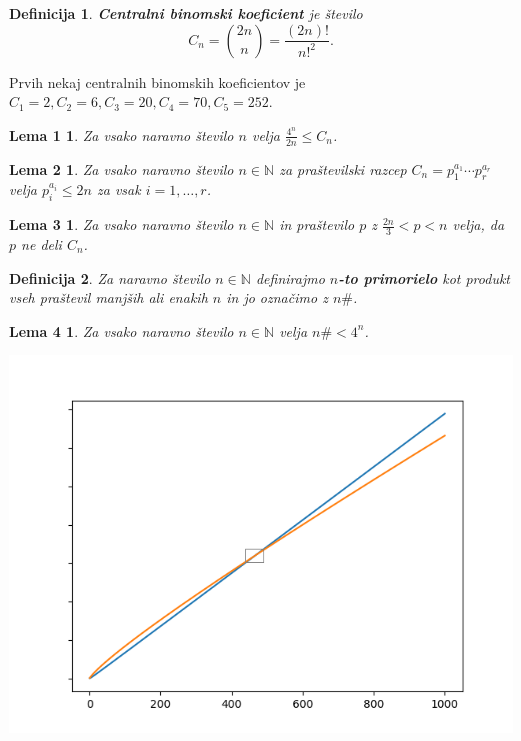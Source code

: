 \documentclass{beamer}
\newtheorem{definicija}{Definicija}
\newtheorem{lema1}{Lema 1}
\newtheorem{lema2}{Lema 2}
\newtheorem{lema3}{Lema 3}
\newtheorem{lema4}{Lema 4}
\def\N{\mathbb{N}}
\begin{document}
\begin{frame}
    \begin{definicija} %
        \textbf{Centralni binomski koeficient} je število $$C_n = \binom{2n}{n} = \frac{(2n)!}{n!^2}.$$
    \end{definicija}
    \pause
    \medskip
    Prvih nekaj centralnih binomskih koeficientov je $C_1 = 2, C_2 = 6, C_3 = 20, C_4 = 70, C_5 = 252$.
    \pause
    \medskip
    \begin{lema1}
        \label{lema1}
        Za vsako naravno število $n$ velja $\frac{4^n}{2n} \leq C_n$.
    \end{lema1}
    \pause
    \medskip
    \begin{lema2}
        \label{lema2}
        Za vsako naravno število $n \in \N$ za praštevilski razcep $C_n = p_1^{a_1} \cdots p_r^{a_r}$ velja $p_i^{a_i} \leq 2n$ za vsak $i = 1,\ldots,r$. 
    \end{lema2}
\end{frame}


\begin{frame}
    \begin{lema3}
        \label{lema3}
        Za vsako naravno število $n \in \N$ in praštevilo $p$ z $\frac{2n}{3} < p < n$ velja, da $p$ ne deli $C_n$. 
    \end{lema3}
    \pause
    \medskip
    \begin{definicija}
        Za naravno število $n \in \N$ definirajmo \textbf{$n$-to primorielo} kot produkt vseh praštevil manjših ali enakih $n$ in jo označimo z $n\#$.
    \end{definicija}
    \pause
    \medskip
    \begin{lema4}
        \label{lema4}
        Za vsako naravno število $n \in \N$ velja $n\# < 4^n$. 
    \end{lema4}
\end{frame}


\begin{frame}
    \centering
    \includegraphics[height=0.97\textheight]{chartout.png}
\end{frame}
\end{document}
